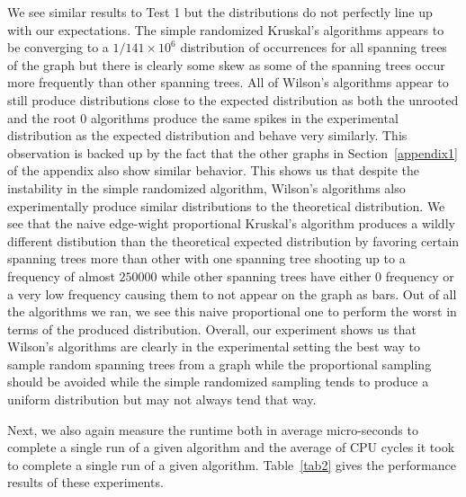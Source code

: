 \documentclass[11pt]{article}
\begin{document}
We see similar results to Test 1 but the distributions do not perfectly line up with our expectations. The simple randomized Kruskal's algorithms appears to be converging to a $1/141\times10^6$ distribution of occurrences for all spanning trees of the graph but there is clearly some skew as some of the spanning trees occur more frequently than other spanning trees. All of Wilson's algorithms appear to still produce distributions close to the expected distribution as both the unrooted and the root $0$ algorithms produce the same spikes in the experimental distribution as the expected distribution and behave very similarly. This observation is backed up by the fact that the other graphs in Section~\ref{appendix1} of the appendix also show similar behavior. This shows us that despite the instability in the simple randomized algorithm, Wilson's algorithms also experimentally produce similar distributions to the theoretical distribution. We see that the naive edge-wight proportional Kruskal's algorithm produces a wildly different distibution than the theoretical expected distribution by favoring certain spanning trees more than other with one spanning tree shooting up to a frequency of almost $250000$ while other spanning trees have either $0$ frequency or a very low frequency causing them to not appear on the graph as bars. Out of all the algorithms we ran, we see this naive proportional one to perform the worst in terms of the produced distribution. Overall, our experiment shows us that Wilson's algorithms are clearly in the experimental setting the best way to sample random spanning trees from a graph while the proportional sampling should be avoided while the simple randomized sampling tends to produce a uniform distribution but may not always tend that way.

Next, we also again measure the runtime both in average micro-seconds to complete a single run of a given algorithm and the average of CPU cycles it took to complete a single run of a given algorithm. Table~\ref{tab2} gives the performance results of these experiments.
\end{document}
